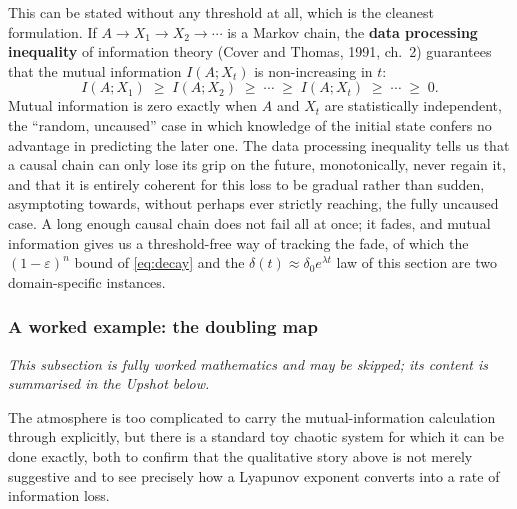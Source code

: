 \documentclass[11pt]{article}
\theoremstyle{definition}
\newenvironment{skipnote}
  {\par\smallskip\noindent\itshape\small}
  {\par\smallskip\noindent}
\newcommand{\eps}{\varepsilon}
\begin{document}
This can be stated without any threshold at all, which is the cleanest formulation. If $A \to X_1 \to X_2 \to \cdots$ is a Markov chain, the \textbf{data processing inequality} of information theory (Cover and Thomas, 1991, ch.\ 2) guarantees that the mutual information $I(A;X_t)$ is non-increasing in $t$:
\[
I(A;X_1) \;\geq\; I(A;X_2) \;\geq\; \cdots \;\geq\; I(A;X_t) \;\geq\; \cdots \;\geq\; 0.
\]
Mutual information is zero exactly when $A$ and $X_t$ are statistically independent, the ``random, uncaused'' case in which knowledge of the initial state confers no advantage in predicting the later one. The data processing inequality tells us that a causal chain can only lose its grip on the future, monotonically, never regain it, and that it is entirely coherent for this loss to be gradual rather than sudden, asymptoting towards, without perhaps ever strictly reaching, the fully uncaused case. A long enough causal chain does not fail all at once; it fades, and mutual information gives us a threshold-free way of tracking the fade, of which the $(1-\eps)^n$ bound of \cref{eq:decay} and the $\delta(t)\approx\delta_0 e^{\lambda t}$ law of this section are two domain-specific instances.

\subsubsection{A worked example: the doubling map}
\label{subsec:doubling}

\begin{skipnote}
This subsection is fully worked mathematics and may be skipped; its content is summarised in the Upshot below.
\end{skipnote}

The atmosphere is too complicated to carry the mutual-information calculation through explicitly, but there is a standard toy chaotic system for which it can be done exactly, both to confirm that the qualitative story above is not merely suggestive and to see precisely how a Lyapunov exponent converts into a rate of information loss.
\end{document}
